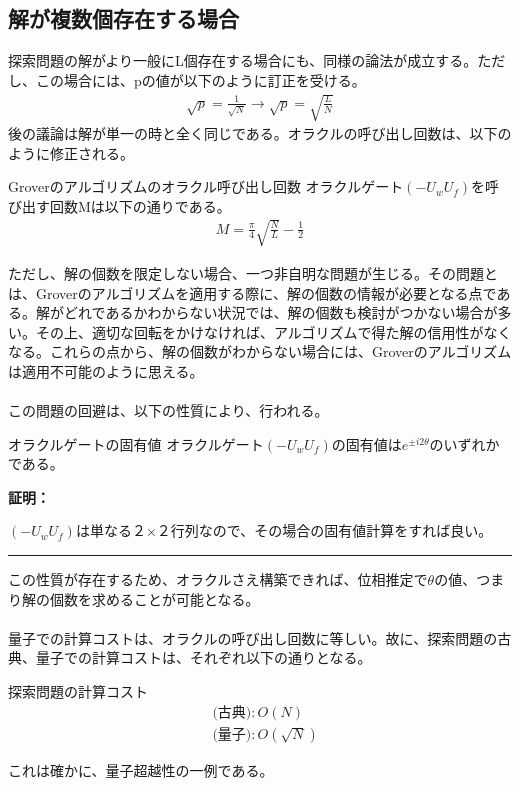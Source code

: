 \documentclass[a4paper,10.5pt]{article}
\numberwithin{equation}{section}
\newenvironment{proofbox}
{\begin{prooflabel}\textbf{証明：}\end{prooflabel}\vspace{0.8em}}
{\par\vspace{1em}\hrule\vspace{1em}}
\begin{document}
\subsection{解が複数個存在する場合}
探索問題の解がより一般にL個存在する場合にも、同様の論法が成立する。ただし、この場合には、pの値が以下のように訂正を受ける。
\begin{align*}
    \sqrt{p}=\frac{1}{\sqrt{N}}\to \sqrt{p}=\sqrt{\frac{L}{N}}
\end{align*}
後の議論は解が単一の時と全く同じである。オラクルの呼び出し回数は、以下のように修正される。
\begin{theorembox}{Groverのアルゴリズムのオラクル呼び出し回数}
    オラクルゲート$(-U_{w}U_{f})$を呼び出す回数Mは以下の通りである。
    \begin{align*}
        M=\frac{\pi}{4}\sqrt{\frac{N}{L}}-\frac{1}{2}
    \end{align*}
\end{theorembox}
ただし、解の個数を限定しない場合、一つ非自明な問題が生じる。その問題とは、Groverのアルゴリズムを適用する際に、解の個数の情報が必要となる点である。解がどれであるかわからない状況では、解の個数も検討がつかない場合が多い。その上、適切な回転をかけなければ、アルゴリズムで得た解の信用性がなくなる。これらの点から、解の個数がわからない場合には、Groverのアルゴリズムは適用不可能のように思える。\\
\\
この問題の回避は、以下の性質により、行われる。
\begin{resultbox}{オラクルゲートの固有値}
    オラクルゲート$(-U_{w}U_{f})$の固有値は$e^{\pm i2\theta}$のいずれかである。
\end{resultbox}
\begin{proofbox}
    $(-U_{w}U_{f})$は単なる２×２行列なので、その場合の固有値計算をすれば良い。
\end{proofbox}
この性質が存在するため、オラクルさえ構築できれば、位相推定で$\theta$の値、つまり解の個数を求めることが可能となる。\\
\\
量子での計算コストは、オラクルの呼び出し回数に等しい。故に、探索問題の古典、量子での計算コストは、それぞれ以下の通りとなる。
\begin{resultbox}{探索問題の計算コスト}
    \begin{align*}
        &\text{(古典)}:O(N)\\
        &\text{(量子)}:O(\sqrt{N})
    \end{align*}
\end{resultbox}
これは確かに、量子超越性の一例である。
\end{document}
